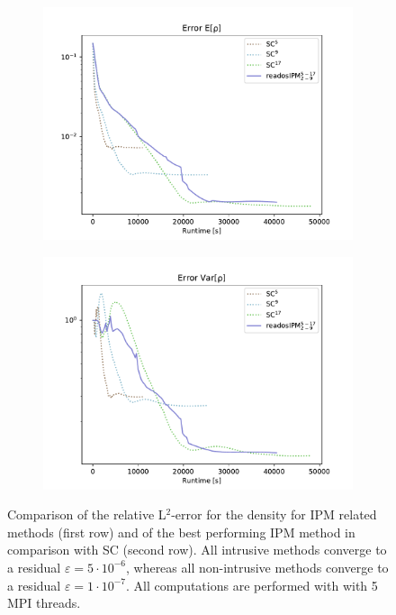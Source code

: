 \begin{figure}[h!]
	\begin{subfigure}{0.5\linewidth}
		\centering
				\includegraphics[scale=0.55]{figs/errorEuler/L2_error_E[rho]_sc.pdf}
		\caption{}
		\label{fig:sub33}
	\end{subfigure}%
	\begin{subfigure}{0.5\linewidth}
		\centering
				\includegraphics[scale=0.55]{figs/errorEuler/L2_error_Var[rho]_sc.pdf}
		\caption{}
		\label{fig:sub34}
	\end{subfigure}
	\caption{Comparison of the relative L$^2$-error for the density for IPM related methods (first row) and of the best performing IPM method in comparison with SC (second row). All intrusive methods converge to a residual $\varepsilon=5\cdot 10^{-6}$, whereas all non-intrusive methods converge to a residual $\varepsilon=1\cdot 10^{-7}$. All computations are performed with with 5 MPI threads.}
	\label{fig:L2ErrorSolution}
\end{figure}
